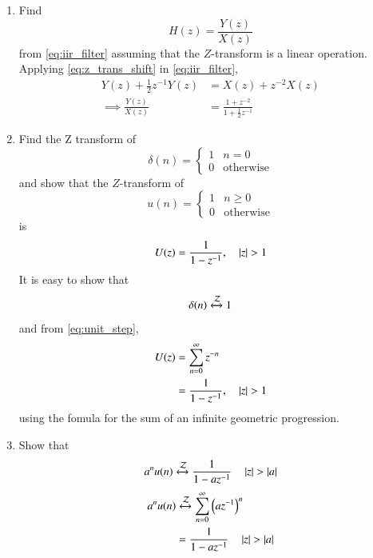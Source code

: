 \documentclass[journal,12pt,twocolumn]{IEEEtran}
\theoremstyle{remark}
\begin{document}
\begin{enumerate}[label=\thesection.\arabic*]
\item Find
%
\begin{equation}
H(z) = \frac{Y(z)}{X(z)}
\end{equation}
%
from  \eqref{eq:iir_filter} assuming that the $Z$-transform is a linear operation.
\\
\solution  Applying \eqref{eq:z_trans_shift} in \eqref{eq:iir_filter},
\begin{align}
Y(z) + \frac{1}{2}z^{-1}Y(z) &= X(z)+z^{-2}X(z)
\\
\implies \frac{Y(z)}{X(z)} &= \frac{1 + z^{-2}}{1 + \frac{1}{2}z^{-1}}
\label{eq:freq_resp}
\end{align}
%
\item Find the Z transform of 
\begin{equation}
\delta(n)
=
\begin{cases}
1 & n = 0
\\
0 & \text{otherwise}
\end{cases}
\end{equation}
and show that the $Z$-transform of
\begin{equation}
\label{eq:unit_step}
u(n)
=
\begin{cases}
1 & n \ge 0
\\
0 & \text{otherwise}
\end{cases}
\end{equation}
is
\begin{equation}
U(z) = \frac{1}{1-z^{-1}}, \quad \left\vert z\right\vert > 1
\end{equation}
\solution It is easy to show that
\begin{equation}
    \delta(n) \xleftrightarrow{\mathcal{Z}} 1
\end{equation}
and from \eqref{eq:unit_step},
\begin{align}
U(z) &= \sum _{n= 0}^{\infty}z^{-n}
\\
&=\frac{1}{1-z^{-1}}, \quad \left\vert z\right\vert > 1
\end{align}
using the fomula for the sum of an infinite geometric progression.
\item Show that 
\begin{equation}
\label{eq:anun}
a^nu(n) \xleftrightarrow{\mathcal{Z}} \frac{1}{1-az^{-1}} \quad \left\vert z\right\vert > \left\vert a\right\vert
\end{equation}
\solution 
\begin{align}
	a^nu(n) &\xleftrightarrow{\mathcal{Z}} \sum_{n = 0}^{\infty}\left(az^{-1}\right)^n \\
			&= \frac{1}{1-az^{-1}} \quad \left\vert z\right\vert > \left\vert a\right\vert
\end{align}

\end{enumerate}
\end{document}
